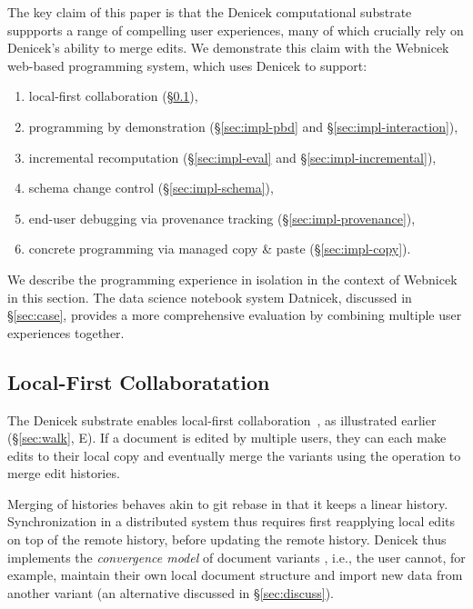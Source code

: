 \documentclass[sigconf,anonymous,screen]{acmart}
\begin{document}
The key claim of this paper is that the Denicek computational substrate suppports a range of
compelling user experiences, many of which crucially rely on Denicek's ability to merge edits.
We demonstrate this claim with the Webnicek web-based programming system, which uses Denicek to support:
%
\begin{enumerate}[itemsep=1.5pt,label=(\roman*),topsep=6pt,leftmargin=20pt]
\item local-first collaboration (\S\ref{sec:impl-collab}),
\item programming by demonstration (\S\ref{sec:impl-pbd} and \S\ref{sec:impl-interaction}),
\item incremental recomputation (\S\ref{sec:impl-eval} and \S\ref{sec:impl-incremental}),
\item schema change control (\S\ref{sec:impl-schema}),
\item end-user debugging via provenance tracking (\S\ref{sec:impl-provenance}),
\item concrete programming via managed copy \& paste (\S\ref{sec:impl-copy}).
\end{enumerate}
%
We describe the programming experience in isolation in the context of Webnicek in this section.
The data science notebook system Datnicek, discussed in \S\ref{sec:case}, provides
a more comprehensive evaluation by combining multiple user experiences together.

\subsection{Local-First Collaboratation}
\label{sec:impl-collab}

The Denicek substrate enables local-first collaboration~\cite{kleppmann-2019-local},
as illustrated earlier (\S\ref{sec:walk}, E). If a document is edited by multiple users, they can
each make edits to their local copy and eventually merge the variants using the operation to
merge edit histories.

Merging of histories behaves akin to git rebase in that it keeps a linear history. Synchronization
in a distributed system thus requires first reapplying local edits on top of the remote history,
before updating the remote history. Denicek thus implements the \emph{convergence model} of
document variants \cite{edwards-2025-schema}, i.e., the user cannot, for example, maintain their
own local document structure and import new data from another variant (an alternative discussed
in \S\ref{sec:discuss}).
\end{document}
